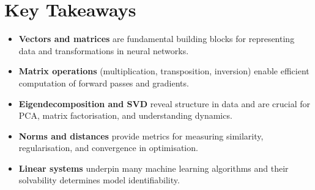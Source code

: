 
\section*{Key Takeaways}

\begin{keytakeaways}
\begin{itemize}[leftmargin=2em]
    \item \textbf{Vectors and matrices} are fundamental building blocks for representing data and transformations in neural networks.
    \item \textbf{Matrix operations} (multiplication, transposition, inversion) enable efficient computation of forward passes and gradients.
    \item \textbf{Eigendecomposition and SVD} reveal structure in data and are crucial for PCA, matrix factorisation, and understanding dynamics.
    \item \textbf{Norms and distances} provide metrics for measuring similarity, regularisation, and convergence in optimisation.
    \item \textbf{Linear systems} underpin many machine learning algorithms and their solvability determines model identifiability.
\end{itemize}
\end{keytakeaways}


